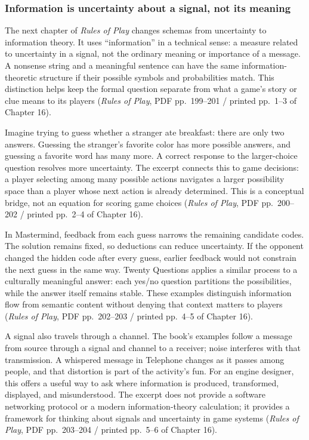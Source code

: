 \subsubsection{Information is uncertainty about a signal, not its meaning}\label{05-engine-i-ch009-information-is-uncertainty-about-a-signal-not-its-meaning}

\hypertarget{05-engine-i-ch009-information-is-uncertainty-about-a-signal-not-its-meaning}{}

The next chapter of \emph{Rules of Play} changes schemas from uncertainty to information theory. It uses ``information'' in a technical sense: a measure related to uncertainty in a signal, not the ordinary meaning or importance of a message. A nonsense string and a meaningful sentence can have the same information-theoretic structure if their possible symbols and probabilities match. This distinction helps keep the formal question separate from what a game's story or clue means to its players (\emph{Rules of Play}, PDF pp.~199--201 / printed pp.~1--3 of Chapter 16).

Imagine trying to guess whether a stranger ate breakfast: there are only two answers. Guessing the stranger's favorite color has more possible answers, and guessing a favorite word has many more. A correct response to the larger-choice question resolves more uncertainty. The excerpt connects this to game decisions: a player selecting among many possible actions navigates a larger possibility space than a player whose next action is already determined. This is a conceptual bridge, not an equation for scoring game choices (\emph{Rules of Play}, PDF pp.~200--202 / printed pp.~2--4 of Chapter 16).

In Mastermind, feedback from each guess narrows the remaining candidate codes. The solution remains fixed, so deductions can reduce uncertainty. If the opponent changed the hidden code after every guess, earlier feedback would not constrain the next guess in the same way. Twenty Questions applies a similar process to a culturally meaningful answer: each yes/no question partitions the possibilities, while the answer itself remains stable. These examples distinguish information flow from semantic content without denying that context matters to players (\emph{Rules of Play}, PDF pp.~202--203 / printed pp.~4--5 of Chapter 16).

A signal also travels through a channel. The book's examples follow a message from source through a signal and channel to a receiver; noise interferes with that transmission. A whispered message in Telephone changes as it passes among people, and that distortion is part of the activity's fun. For an engine designer, this offers a useful way to ask where information is produced, transformed, displayed, and misunderstood. The excerpt does not provide a software networking protocol or a modern information-theory calculation; it provides a framework for thinking about signals and uncertainty in game systems (\emph{Rules of Play}, PDF pp.~203--204 / printed pp.~5--6 of Chapter 16).

